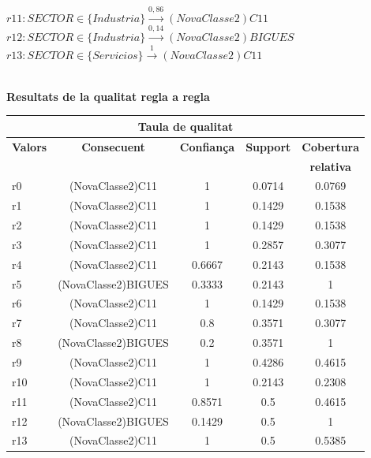 $r11: SECTOR \in  \{ Industria \} \stackrel{0,86}{\longrightarrow} (NovaClasse2)C11$\\

$r12: SECTOR \in  \{ Industria \} \stackrel{0,14}{\longrightarrow} (NovaClasse2)BIGUES$\\

$r13: SECTOR \in  \{ Servicios \} \stackrel{1}{\longrightarrow} (NovaClasse2)C11$\\

\newpage
\vspace{3ex}
\mbox{ }
\begin{center} \Large \bf Resultats de la qualitat regla a regla \end{center}

\begin{center}
\begin{tabular}{|p{3cm}|c|c|c|c|}
\hline
\multicolumn{5}{|c|}{\bf Taula de qualitat} \\ 
\hline
{\bf Valors} & {\bf Consecuent} & {\bf Confian\c ca} & {\bf Support} & {\bf Cobertura} \\ 
 & {\bf } & {\bf } & {\bf } & {\bf relativa} \\ 
\hline
\hline
r0 & (NovaClasse2)C11 & 1 & 0.0714 & 0.0769 \\ 
\hline
r1 & (NovaClasse2)C11 & 1 & 0.1429 & 0.1538 \\ 
\hline
r2 & (NovaClasse2)C11 & 1 & 0.1429 & 0.1538 \\ 
\hline
r3 & (NovaClasse2)C11 & 1 & 0.2857 & 0.3077 \\ 
\hline
r4 & (NovaClasse2)C11 & 0.6667 & 0.2143 & 0.1538 \\ 
\hline
r5 & (NovaClasse2)BIGUES & 0.3333 & 0.2143 & 1 \\ 
\hline
r6 & (NovaClasse2)C11 & 1 & 0.1429 & 0.1538 \\ 
\hline
r7 & (NovaClasse2)C11 & 0.8 & 0.3571 & 0.3077 \\ 
\hline
r8 & (NovaClasse2)BIGUES & 0.2 & 0.3571 & 1 \\ 
\hline
r9 & (NovaClasse2)C11 & 1 & 0.4286 & 0.4615 \\ 
\hline
r10 & (NovaClasse2)C11 & 1 & 0.2143 & 0.2308 \\ 
\hline
r11 & (NovaClasse2)C11 & 0.8571 & 0.5 & 0.4615 \\ 
\hline
r12 & (NovaClasse2)BIGUES & 0.1429 & 0.5 & 1 \\ 
\hline
r13 & (NovaClasse2)C11 & 1 & 0.5 & 0.5385 \\ 
\hline
\hline
\end{tabular}
\end{center} \vfill


